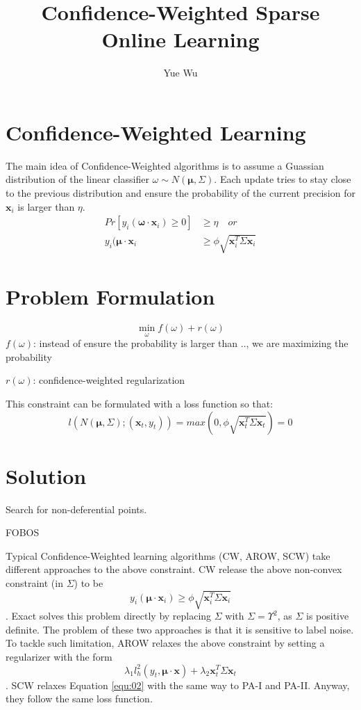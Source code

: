 \documentclass{article}
\begin{document}
\title{Confidence-Weighted Sparse Online Learning}
\author{Yue Wu}

\section{Confidence-Weighted Learning}
The main idea of Confidence-Weighted algorithms is to assume a Guassian distribution 
of the linear classifier $\omega\sim N(\bm{\mu},\Sigma)$. Each update
tries to stay close to the previous distribution and ensure the
probability of the current precision for $\bm{x}_i$ is larger than
$\eta$.
\begin{equation}
  \begin{aligned}
    Pr[y_i(\bm{\omega}\cdot \bm{x}_i) \geq 0] & \geq \eta \quad or \\
    y_i(\bm{\mu}\cdot \bm{x}_i & \geq  \phi\sqrt{\bm{x}_i^T\Sigma\bm{x}_i}
  \end{aligned}
  \label{equ:01}
\end{equation}

\section{Problem Formulation}
$$\min_\omega{f(\omega) + r(\omega)}$$
$f(\omega)$: instead of ensure the probability is larger than .., we
are maximizing the probability

$r(\omega)$: confidence-weighted regularization


This constraint can be formulated with a loss function  so that:
\begin{equation}
  l(N(\bm{\mu},\Sigma);(\bm{x}_t,y_t)) = max (0,
  \phi\sqrt{\bm{x}_t^T\Sigma\bm{x}_t}) = 0
  \label{equ:02}
\end{equation}

\section{Solution}
Search for non-deferential points. 

FOBOS

Typical Confidence-Weighted learning algorithms (CW, AROW, SCW) take
different approaches to the above constraint. CW release the above
non-convex constraint (in $\Sigma$) to be $$y_i(\bm{\mu}\cdot\bm{x}_i)
\geq \phi\sqrt{\bm{x}_i^T\Sigma\bm{x}_i}$$. Exact solves this problem
directly by replacing $\Sigma$ with $\Sigma=\Upsilon^2$, as $\Sigma$
is positive definite. The problem of these two approaches is that it
is sensitive to label noise. To tackle such limitation, AROW relaxes 
the above constraint by setting a regularizer with the form 
$$\lambda_1 l_h^2(y_t, \bm{\mu}\cdot\bm{x}) + \lambda_2\bm{x}_t^T\Sigma\bm{x}_t$$. 
SCW relaxes Equation \ref{equ:02} with the same way to PA-I and PA-II.
Anyway, they follow the same loss function. 
\end{document}
